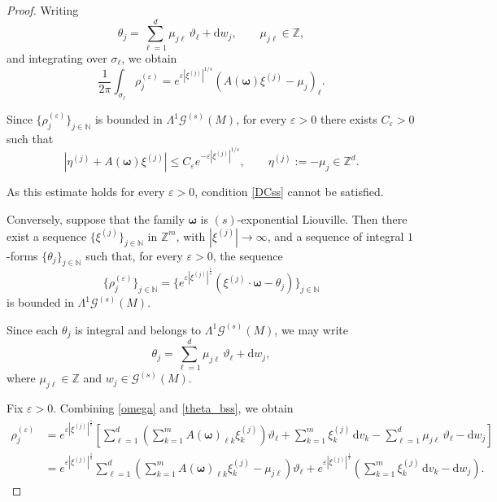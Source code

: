 \documentclass[11pt,reqno]{amsart}
\numberwithin{equation}{section}
\begin{document}
\begin{proof}
	Writing
	\[
	\theta_j = \sum_{\ell=1}^d \mu_{j\ell}\,\vartheta_\ell + \mathrm{d}w_j,
	\qquad \mu_{j\ell}\in\mathbb{Z},
	\]
	and integrating over $\sigma_\ell$, we obtain
	\[
	\frac{1}{2\pi} \int_{\sigma_\ell} \rho_j^{(\varepsilon)} 
	= e^{\varepsilon|\xi^{(j)}|^{1/s}} \left( A(\boldsymbol{\omega})\xi^{(j)} - \mu_j \right)_\ell.
	\]
	
	Since $\{\rho_j^{(\varepsilon)}\}_{j\in\mathbb{N}}$ is bounded in $\mathsf{\Lambda}^1 \mathscr{G}^{(s)}(M)$, for every $\varepsilon>0$ there exists $C_\varepsilon>0$ such that
	\[
	|\eta^{(j)} + A(\boldsymbol{\omega})\xi^{(j)}| 	\le C_\varepsilon e^{-\varepsilon|\xi^{(j)}|^{1/s}},
	\qquad \eta^{(j)}:=-\mu_j\in\mathbb{Z}^d.
	\]
	
	As this estimate holds for every $\varepsilon>0$,  condition \eqref{DCss} cannot be satisfied. 
	
	Conversely, suppose that the family $\boldsymbol{\omega}$ is $(s)$-exponential Liouville. 	Then there exist a sequence $\{\xi^{(j)}\}_{j\in\mathbb{N}}$ in $\mathbb{Z}^m$, with $|\xi^{(j)}|\to\infty$, and a sequence of integral $1$-forms $\{\theta_j\}_{j\in\mathbb{N}}$ such that, 
	for every $\varepsilon>0$, the sequence
	\[
	\{\rho_j^{(\varepsilon)}\}_{j\in\mathbb{N}} = \big\{e^{\varepsilon|\xi^{(j)}|^{\frac{1}{s}}} 	(\xi^{(j)} \cdot \boldsymbol{\omega} - \theta_j)\big\}_{j\in\mathbb{N}}
	\]
	is bounded in $\mathsf{\Lambda}^1 \mathscr{G}^{(s)}(M)$.
	
	Since each $\theta_j$ is integral and belongs to 
	$\mathsf{\Lambda}^1\mathscr{G}^{(s)}(M)$, 
	we may write
	\begin{equation}\label{theta_bss}
		\theta_j = \sum_{\ell=1}^{d} \mu_{j\ell}\,\vartheta_\ell + \mathrm{d}w_j,
	\end{equation}
	where $\mu_{j\ell}\in\mathbb{Z}$ and $w_j\in\mathscr{G}^{(s)}(M)$.
	
	Fix $\varepsilon>0$. 
	Combining \eqref{omega} and \eqref{theta_bss}, we obtain
	\begin{align*}
		\rho_j^{(\varepsilon)}
		&= e^{\varepsilon|\xi^{(j)}|^{\frac{1}{s}}} \left[ 	\sum_{\ell=1}^{d} \left( \sum_{k=1}^{m} A(\boldsymbol{\omega})_{\ell k}\xi^{(j)}_k \right)\vartheta_\ell
		+ \sum_{k=1}^{m}\xi^{(j)}_k\,\mathrm{d}v_k 	- \sum_{\ell=1}^{d} \mu_{j\ell}\,\vartheta_\ell - \mathrm{d}w_j
		\right] \\ 
		&= e^{\varepsilon|\xi^{(j)}|^{\frac{1}{s}}} \sum_{\ell=1}^{d} \left( \sum_{k=1}^{m}
		A(\boldsymbol{\omega})_{\ell k}\xi^{(j)}_k - \mu_{j\ell} 	\right)\vartheta_\ell
		+ e^{\varepsilon|\xi^{(j)}|^{\frac{1}{s}}} 	\left( 	\sum_{k=1}^{m} \xi^{(j)}_k\,\mathrm{d}v_k - \mathrm{d}w_j \right).
	\end{align*}
	

\end{proof}
\end{document}
